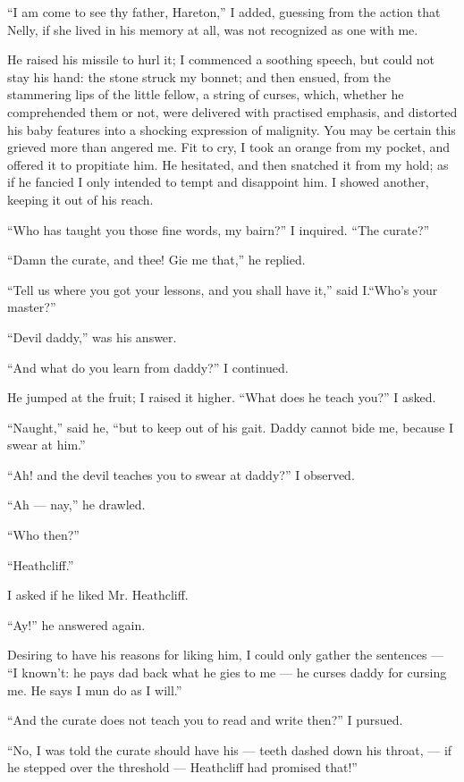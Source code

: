 \par “I am come to see thy father, Hareton,” I added, guessing from the action that Nelly, if she lived in his memory at all, was not recognized as one with me.
\par He raised his missile to hurl it; I commenced a soothing speech, but could not stay his hand: the stone struck my bonnet; and then ensued, from the stammering lips of the little fellow, a string of curses, which, whether he comprehended them or not, were delivered with practised emphasis, and distorted his baby features into a shocking expression of malignity. You may be certain this grieved more than angered me. Fit to cry, I took an orange from my pocket, and offered it to propitiate him. He hesitated, and then snatched it from my hold; as if he fancied I only intended to tempt and disappoint him. I showed another, keeping it out of his reach.
\par “Who has taught you those fine words, my bairn?” I inquired. “The curate?”
\par “Damn the curate, and thee! Gie me that,” he replied.
\par “Tell us where you got your lessons, and you shall have it,” said I.“Who's your master?”
\par “Devil daddy,” was his answer.
\par “And what do you learn from daddy?” I continued.
\par He jumped at the fruit; I raised it higher. “What does he teach you?” I asked.
\par “Naught,” said he, “but to keep out of his gait. Daddy cannot bide me, because I swear at him.”
\par “Ah! and the devil teaches you to swear at daddy?” I observed.
\par “Ah — nay,” he drawled.
\par “Who then?”
\par “Heathcliff.”
\par I asked if he liked Mr. Heathcliff.
\par “Ay!” he answered again.
\par Desiring to have his reasons for liking him, I could only gather the sentences — “I known't: he pays dad back what he gies to me — he curses daddy for cursing me. He says I mun do as I will.”
\par “And the curate does not teach you to read and write then?” I pursued.
\par “No, I was told the curate should have his — teeth dashed down his throat, — if he stepped over the threshold — Heathcliff had promised that!”
